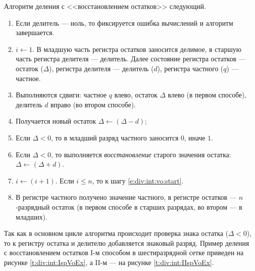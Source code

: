 Алгоритм деления с <<восстановлением остатков>> следующий.
\begin{enumerate}
	\item Если делитель --- ноль, то фиксируется ошибка вычислений и алгоритм завершается.
	\item $i\gets 1$. В младшую часть регистра остатков заносится делимое, в старшую часть регистра делителя --- делитель. Далее состояние регистра остатков --- остаток ($\Delta$), регистра делителя --- делитель ($d$), регистра частного ($q$) --- частное.
	\item\label{e:div:int:vo:start} Выполняются сдвиги: частное $q$ влево, остаток $\Delta$ влево (в первом способе), делитель $d$ вправо (во втором способе).
	\item Получается новый остаток $\Delta\gets(\Delta - d)$;
	\item Если $\Delta < 0$, то в младший разряд частного заносится $0$, иначе $1$.
	\item Если $\Delta < 0$, то выполняется \emph{восстановление} старого значения остатка: $\Delta\gets(\Delta + d)$.
	\item $i\gets (i + 1)$. Если $i\le n$, то к шагу \ref{e:div:int:vo:start}.
	\item В регистре частного получено значение частного, в регистре остатков --- $n$-разрядный остаток (в первом способе в старших разрядах, во втором --- в младших).
\end{enumerate}

Так как в основном цикле алгоритма происходит проверка знака остатка ($\Delta < 0$), то к регистру остатка и делителю добавляется знаковый разряд. Пример деления с восстановлением остатков I-м способом в шестиразрядной сетке приведен на рисунке \ref{t:div:int:IspVoEx}, а II-м --- на рисунке \ref{t:div:int:IIspVoEx}.

